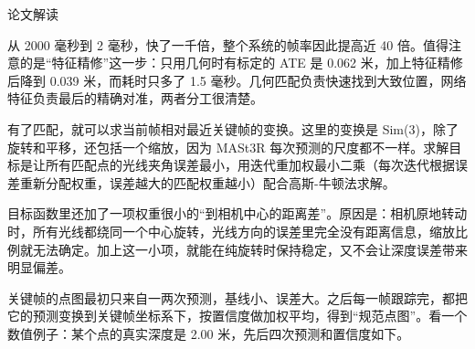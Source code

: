 \begin{interp}{论文解读}
\begin{center}
\end{center}

从 2000 毫秒到 2 毫秒，快了一千倍，整个系统的帧率因此提高近 40 倍。值得注意的是“特征精修”这一步：只用几何时有标定的 ATE 是 0.062 米，加上特征精修后降到 0.039 米，而耗时只多了 1.5 毫秒。几何匹配负责快速找到大致位置，网络特征负责最后的精确对准，两者分工很清楚。



有了匹配，就可以求当前帧相对最近关键帧的变换。这里的变换是 Sim(3)，除了旋转和平移，还包括一个缩放，因为 MASt3R 每次预测的尺度都不一样。求解目标是让所有匹配点的光线夹角误差最小，用迭代重加权最小二乘（每次迭代根据误差重新分配权重，误差越大的匹配权重越小）配合高斯-牛顿法求解。

目标函数里还加了一项权重很小的“到相机中心的距离差”。原因是：相机原地转动时，所有光线都绕同一个中心旋转，光线方向的误差里完全没有距离信息，缩放比例就无法确定。加上这一小项，就能在纯旋转时保持稳定，又不会让深度误差带来明显偏差。


关键帧的点图最初只来自一两次预测，基线小、误差大。之后每一帧跟踪完，都把它的预测变换到关键帧坐标系下，按置信度做加权平均，得到“规范点图”。看一个数值例子：某个点的真实深度是 2.00 米，先后四次预测和置信度如下。


\end{interp}
